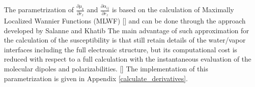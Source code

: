 The parametrization of $\frac{\partial \mu_{k}}{\partial r_z}$ and $\frac{\partial\alpha_{ij}}{\partial r_z}$ is based 
on the calculation of Maximally Localized Wannier Functions (MLWF) [\cite{Marzari97}] 
 and can be done through the approach developed by Salanne  and Khatib 
The main advantage of such approximation for the calculation of the susceptibility is that still retain details of the
water/vapor interfaces including the full electronic structure, but its computational
cost is reduced with respect to a full calculation with the instantaneous evaluation of the 
molecular dipoles and polarizabilities. [\cite{sulpizi2013}] 
The implementation of this parametrization is given in Appendix \ref{calculate_derivatives}.
